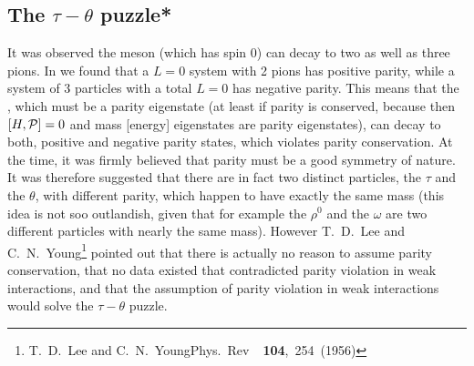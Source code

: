  \subsection{The $\tau-\theta$ puzzle*}
 It was observed the  meson (which has spin 0) can decay to two as well as three
 pions. In  we found that a $L=0$ system with 2 pions has positive parity, while a system of $3$ particles with a total $L=0$ has negative parity. This means that the
 , which must be a parity eigenstate (at least if parity is conserved, because then $[H,\mathcal{P}]=0$ and mass [energy] eigenstates are parity eigenstates), can decay to both, positive and negative parity states,
 which violates parity conservation. At the time, it was firmly
 believed that parity must be a good symmetry of nature. It was
 therefore suggested that there are in fact two distinct particles,
 the $\tau$ and the $\theta$, with different parity, which happen to
 have exactly the same mass (this idea is not soo outlandish, given
 that for example the $\rho^0$ and the $\omega$ are two different
 particles with nearly the same mass). However T.~D.~Lee and
 C.~N.~Young\footnote{T.~D.~Lee and
 C.~N.~YoungPhys.~Rev~{\bf~104},~254~(1956)} pointed out that there is
 actually no reason to assume parity conservation, that no data
 existed that contradicted parity violation in weak interactions, and
 that the assumption of parity violation in weak interactions would
 solve the $\tau-\theta$ puzzle.

